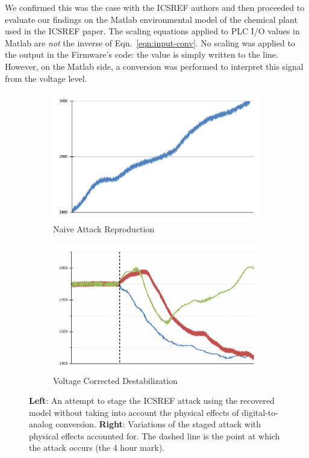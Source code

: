 We confirmed this was the case with the ICSREF authors and then proceeded to evaluate our findings on the Matlab environmental model of the chemical plant used in the ICSREF paper.
The scaling equations applied to PLC I/O values in Matlab are \emph{not} the inverse of Eqn.~\ref{eqn:input-conv}.
No scaling was applied to the output in the Firmware's code: the value is simply written to the line.
However, on the Matlab side, a conversion was performed to interpret this signal from the voltage level.

\begin{figure}
    \centering
    \begin{subfigure}[b]{0.49\textwidth}
        \includegraphics[width=\textwidth]{plc-orig.pdf}
        \caption{Naive Attack Reproduction}
        \label{fig:orig-attack}
    \end{subfigure}
    \hfill
    \begin{subfigure}[b]{0.49\textwidth}
        \includegraphics[width=\textwidth]{dashed-plc.pdf}
	    \caption{Voltage Corrected Destabilization}
        \label{fig:noconv-attack}
    \end{subfigure}
    \hfill
	\caption{\textbf{Left}: An attempt to stage the ICSREF attack using the recovered model without taking into account the physical effects of digital-to-analog conversion. \textbf{Right}: Variations of the staged attack with physical effects accounted for. The dashed line is the point at which the attack occurs (the 4 hour mark).}
    \label{fig:plc-eval}
\end{figure}

